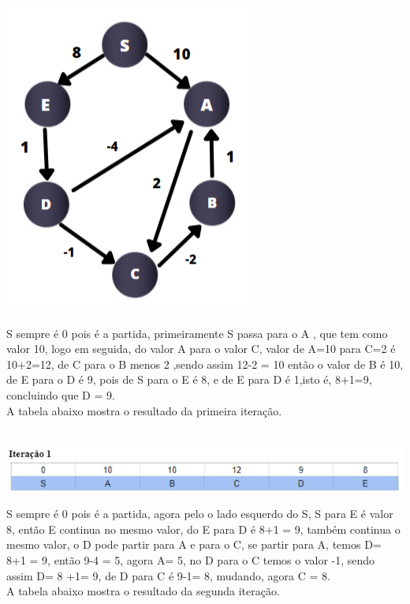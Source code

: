 \documentclass[11pt]{article} %
\begin{document}
\begin{enumerate}[a)]
	\begin{minipage}{0.6\textwidth}
  		\includegraphics[scale = 0.9]{q2d.png}
	\end{minipage}
	\begin{minipage}{0.3\textwidth}	
\hspace*{1cm}	S sempre é 0 pois é a partida, primeiramente S passa para o A , que tem como valor 10, logo em seguida, do valor A para o valor C, valor de A=10 para C=2 é 10+2=12, de C para o B menos 2 ,sendo assim 12-2 = 10 então o valor de B é 10, de E para o D é 9, pois de S para o E é 8, e de E para D é 1,isto é, 8+1=9, concluindo que D = 9. \\ A tabela abaixo mostra o resultado da primeira iteração.
	\end{minipage} \\

	\includegraphics[scale = 0.9]{q2d1.png}

\vspace*{1cm}
\hspace*{1cm}	 S sempre é 0 pois é a partida, agora pelo o lado esquerdo do S, S para E é valor 8, então E continua  no mesmo valor, do E  para D é 8+1 = 9, também continua o mesmo valor, o D pode partir para A e para o C, se partir para A, temos D= 8+1 = 9, então  9-4 = 5, agora A= 5, no D para o C temos o valor -1, sendo assim D= 8 +1= 9,  de D para C é 9-1= 8, mudando, agora C = 8. \\ A tabela abaixo mostra o resultado da segunda iteração. \\ \\
	

\end{enumerate}
\end{document}
